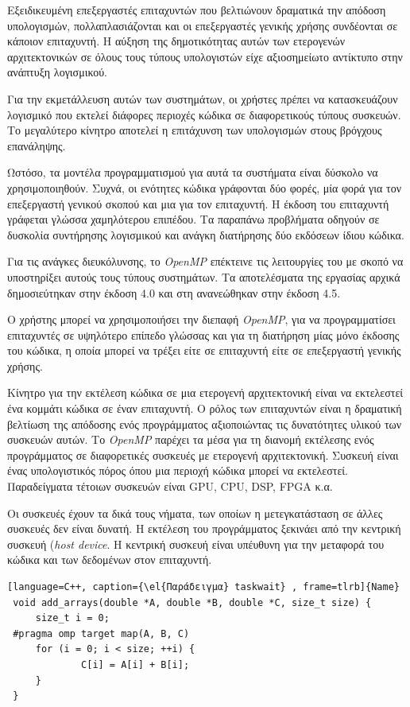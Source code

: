 \documentclass[12pt]{article}
\newcommand{\en}[1]{\foreignlanguage{english}{#1}}
\newcommand{\el}[1]{\selectlanguage{greek}{#1}\selectlanguage{english}}
\begin{document}
Εξειδικευμένη επεξεργαστές επιταχυντών που βελτιώνουν δραματικά την απόδοση υπολογισμών, πολλαπλασιάζονται και οι επεξεργαστές γενικής χρήσης συνδέονται σε κάποιον επιταχυντή. Η αύξηση της δημοτικότητας αυτών των ετερογενών αρχιτεκτονικών σε όλους τους τύπους υπολογιστών είχε αξιοσημείωτο αντίκτυπο στην ανάπτυξη λογισμικού.

Για την εκμετάλλευση αυτών των συστημάτων, οι χρήστες πρέπει να κατασκευάζουν λογισμικό που εκτελεί διάφορες περιοχές κώδικα σε διαφορετικούς τύπους συσκευών. Το μεγαλύτερο κίνητρο αποτελεί η επιτάχυνση των υπολογισμών στους βρόγχους επανάληψης.

Ωστόσο, τα μοντέλα προγραμματισμού για αυτά τα συστήματα είναι δύσκολο να χρησιμοποιηθούν. Συχνά, οι ενότητες κώδικα γράφονται δύο φορές, μία φορά για τον επεξεργαστή γενικού σκοπού και μια για τον επιταχυντή. Η έκδοση του επιταχυντή γράφεται γλώσσα χαμηλότερου επιπέδου.
Τα παραπάνω προβλήματα οδηγούν σε δυσκολία συντήρησης λογισμικού και ανάγκη διατήρησης δύο εκδόσεων ίδιου κώδικα.

Για τις ανάγκες διευκόλυνσης, το \emph{\en{OpenMP}} επέκτεινε τις λειτουργίες του με σκοπό να υποστηρίξει αυτούς τους τύπους συστημάτων\cite{barbara}. Τα αποτελέσματα της εργασίας αρχικά δημοσιεύτηκαν στην έκδοση 4.0 και στη ανανεώθηκαν στην έκδοση 4.5.

Ο χρήστης μπορεί να χρησιμοποιήσει την διεπαφή \emph{\en{OpenMP}}, για να προγραμματίσει επιταχυντές σε υψηλότερο επίπεδο γλώσσας και για τη διατήρηση μίας μόνο έκδοσης του κώδικα, η οποία μπορεί να τρέξει είτε σε επιταχυντή είτε σε επεξεργαστή γενικής χρήσης.

Κίνητρο για την εκτέλεση κώδικα σε μια ετερογενή αρχιτεκτονική είναι να εκτελεστεί ένα κομμάτι κώδικα σε έναν επιταχυντή. Ο ρόλος των επιταχυντών είναι η δραματική βελτίωση της απόδοσης ενός προγράμματος αξιοποιώντας τις δυνατότητες υλικού των συσκευών αυτών. Το \emph{\en{OpenMP}} παρέχει τα μέσα για τη διανομή εκτέλεσης ενός προγράμματος σε διαφορετικές συσκευές με ετερογενή αρχιτεκτονική. Συσκευή είναι ένας υπολογιστικός πόρος όπου μια περιοχή κώδικα μπορεί να εκτελεστεί. Παραδείγματα τέτοιων συσκευών είναι GPU, CPU, DSP, FPGA κ.α.

Οι συσκευές έχουν τα δικά τους νήματα, των οποίων η μετεγκατάσταση σε άλλες συσκευές δεν είναι δυνατή. Η εκτέλεση του προγράμματος ξεκινάει από την κεντρική συσκευή (\emph{\en{host device}}. Η κεντρική συσκευή είναι υπέυθυνη για την μεταφορά του κώδικα και των δεδομένων στον επιταχυντή.

\begin{lstlisting}[language=C++, caption={\el{Παράδειγμα} taskwait} , frame=tlrb]{Name}
 void add_arrays(double *A, double *B, double *C, size_t size) {
     size_t i = 0;
 #pragma omp target map(A, B, C)
     for (i = 0; i < size; ++i) {
             C[i] = A[i] + B[i];
     }
 }
\end{lstlisting}
\end{document}
